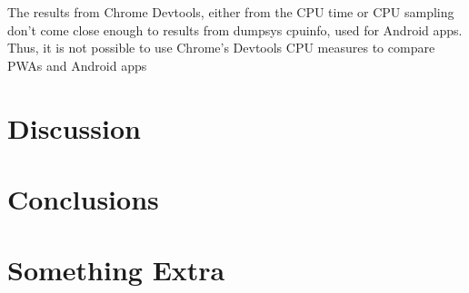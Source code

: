 \documentclass{kththesis}
\begin{document}
The results from Chrome Devtools, either from the CPU time or CPU sampling don't come close enough to results from dumpsys cpuinfo, used for Android apps. Thus, it is not possible to use Chrome's Devtools CPU measures to compare PWAs and Android apps

\chapter{Discussion}
\blindtext


\chapter{Conclusions}
\blindtext


\listoffigures
\printbibliography[heading=bibintoc]

\appendix

\chapter{Something Extra}

\tailmatter
\end{document}
